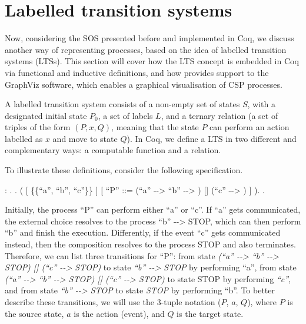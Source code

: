 \section{Labelled transition systems}
\label{section:lts}

Now, considering the SOS presented before and implemented in Coq, we discuss another way of representing processes, based on the idea of labelled transition systems (LTSs). This section will cover how the LTS concept is embedded in Coq via functional and inductive definitions, and how \CSPcoq{} provides support to the GraphViz software, which enables a graphical visualisation of CSP processes.

A labelled transition system consists of a non-empty set of states $ S $, with a designated initial state $ P_{0} $, a set of labels $ L $, and a ternary relation (a set of triples of the form $(P,x,Q)$, meaning that the state $ P $ can perform an action labelled as $ x $ and move to state $ Q $). In Coq, we define a LTS in two different and complementary ways: a computable function and a relation.

To illustrate these definitions, consider the following \CSPcoq{} specification.

\begin{coqdoccode}
	\coqdocnoindent
	  : .\coqdoceol
	\coqdocnoindent
	.\coqdoceol
	\coqdocindent{1.00em}
	 (\coqdoceol
	\coqdocindent{2.00em}
	\coqdoceol
	\coqdocindent{2.00em}
	[  \{\{``a'', ``b'', ``c''\}\} ]\coqdoceol
	\coqdocindent{2.00em}
	[ ``P'' ::= (``a'' -{}-> ``b'' -{}-> ) [] (``c'' -{}-> ) ]\coqdoceol
	\coqdocindent{1.00em}
	).\coqdoceol
	\coqdocnoindent
	.\coqdoceol
\end{coqdoccode}

Initially, the process ``P'' can perform either ``a'' or ``c''. If ``a'' gets communicated, the external choice resolves to the process ``b'' -{}-> STOP, which can then perform ``b'' and finish the execution. Differently, if the event ``c'' gets communicated instead, then the composition resolves to the process STOP and also terminates. Therefore, we can list three transitions for ``P'': from state \emph{(``a'' -{}-> ``b'' -{}-> STOP) [] (``c'' -{}-> STOP)} to state \emph{``b'' -{}-> STOP} by performing ``a'', from state \emph{(``a'' -{}-> ``b'' -{}-> STOP) [] (``c'' -{}-> STOP)} to state STOP by performing \emph{``c''}, and from state \emph{``b'' -{}-> STOP} to state \emph{STOP} by performing ``b''. To better describe these transitions, we will use the 3-tuple notation ($ P $, $ a $, $ Q $), where $ P $ is the source state, $ a $ is the action (event), and $ Q $ is the target state.

